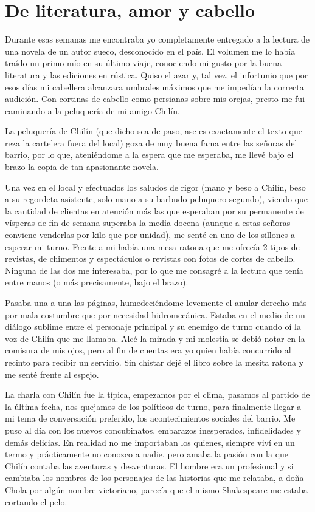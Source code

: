 \documentclass[11pt,twoside,openright,a6paper]{book}
\begin{document}
\chapter*{De literatura, amor y cabello}

Durante esas semanas me encontraba yo completamente entregado a la lectura de una novela de un autor sueco, desconocido en el país. El volumen me lo había traído un primo mío en su último viaje, conociendo mi gusto por la buena literatura y las ediciones en rústica. Quiso el azar y, tal vez, el infortunio que por esos días mi cabellera alcanzara umbrales máximos que me impedían la correcta audición. Con cortinas de cabello como persianas sobre mis orejas, presto me fui caminando a la peluquería de mi amigo Chilín.

La peluquería de Chilín (que dicho sea de paso, ase es exactamente el texto que reza la cartelera fuera del local) goza de muy buena fama entre las señoras del barrio, por lo que, ateniéndome a la espera que me esperaba, me llevé bajo el brazo la copia de tan apasionante novela.

Una vez en el local y efectuados los saludos de rigor (mano y beso a Chilín, beso a su regordeta asistente, solo mano a su barbudo peluquero segundo), viendo que la cantidad de clientas en atención más las que esperaban por su permanente de vísperas de fin de semana superaba la media docena (aunque a estas señoras conviene venderlas por kilo que por unidad), me senté en uno de los sillones a esperar mi turno. Frente a mi había una mesa ratona que me ofrecía 2 tipos de revistas, de chimentos y espectáculos o revistas con fotos de cortes de cabello. Ninguna de las dos me interesaba, por lo que me consagré a la lectura que tenía entre manos (o más precisamente, bajo el brazo).

Pasaba una a una las páginas, humedeciéndome levemente el anular derecho más por mala costumbre que por necesidad hidromecánica. Estaba en el medio de un diálogo sublime entre el personaje principal y su enemigo de turno cuando oí la voz de Chilín que me llamaba. Alcé la mirada y mi molestia se debió notar en la comisura de mis ojos, pero al fin de cuentas era yo quien había concurrido al recinto para recibir un servicio. Sin chistar dejé el libro sobre la mesita ratona y me senté frente al espejo.

La charla con Chilín fue la típica, empezamos por el clima, pasamos al partido de la última fecha, nos quejamos de los políticos de turno, para finalmente llegar a mi tema de conversación preferido, los acontecimientos sociales del barrio. Me puso al día con los nuevos concubinatos, embarazos inesperados, infidelidades y demás delicias. En realidad no me importaban los quienes, siempre viví en un termo y prácticamente no conozco a nadie, pero amaba la pasión con la que Chilín contaba las aventuras y desventuras. El hombre era un profesional y si cambiaba los nombres de los personajes de las historias que me relataba, a doña Chola por algún nombre victoriano, parecía que el mismo Shakespeare me estaba cortando el pelo.
\end{document}
